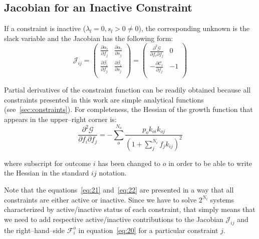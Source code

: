 \documentclass{article}
\begin{document}
\subsection{Jacobian for an Inactive Constraint}
\label{sec:jacobianInactive}

\noindent If a constraint is inactive ($\lambda_l = 0, s_l > 0 \ne 0$), the
corresponding unknown is the slack variable and the Jacobian has the following
form:
\begin{equation}
\label{eq:22}
    \mathcal{J}_{ij}
  =
    \begin{pmatrix}
        \frac{\partial \alpha_i}{\partial f_j}
      & \frac{\partial \alpha_i}{\partial s_j} \\
        \frac{\partial \beta_i}{\partial f_j}
      & \frac{\partial \beta_i}{\partial s_j} \\
    \end{pmatrix}
  =
    \begin{pmatrix}
        \frac{\partial^2 \mathcal{G}}{\partial f_i \partial f_j}
      & 0 \\
        -\frac{\partial \mathcal{C}_i}{\partial f_j}
      & -1 \\
    \end{pmatrix}
\end{equation}

\noindent Partial derivatives of the constraint function can be readily obtained
because all constraints presented in this work are simple analytical functions
(see~\autoref{sec:constraints}). For completeness, the Hessian of the growth
function that appears in the upper--right corner is:
\begin{equation}
\label{eq:23}
    \frac{\partial^2 \mathcal{G}}{\partial f_i \partial f_j}
  = 
    - \sum_{o}^{N_o}
      \frac{p_o k_{oi} k_{oj}}{\left(1 + \sum_{j}^{N_c} f_j k_{ij} \right)^2}
\end{equation}

\noindent where subscript for outcome $i$ has been changed to $o$ in order to be
able to write the Hessian in the standard $ij$ notation.

\indent Note that the equations~\eqref{eq:21} and~\eqref{eq:22} are presented in
a way that all constraints are either active or inactive. Since we have to solve
$2^{N_l}$ systems characterized by active/inactive status of each constraint,
that simply means that we need to add respective active/inactive contributions
to the Jacobian $\mathcal{J}_{ij}$ and the right--hand--side $\mathcal{F}_i^o$
in equation~\eqref{eq:20} for a particular constraint $j$.
\end{document}
